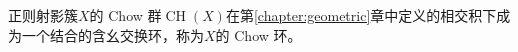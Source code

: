 \begin{remark}
正则射影簇$X$的 Chow 群$\operatorname{CH}(X)$在第\ref{chapter:geometric}章中定义的相交积下成为一个结合的含幺交换环，称为$X$的 Chow 环。
\end{remark}



